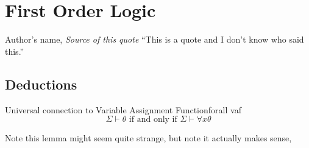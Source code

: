
\chapter{First Order Logic}

\begin{chapquote}{Author's name, \textit{Source of this quote}}
``This is a quote and I don't know who said this.''
\end{chapquote}

\section{Deductions}

\begin{lemma}{Universal connection to Variable Assignment Function}{forall vaf}
    \[
    \Sigma \vdash \theta \text { if and only if } \Sigma \vdash \forall x \theta
    \]
\end{lemma}

Note this lemma might seem quite strange, but note it actually makes sense, %

